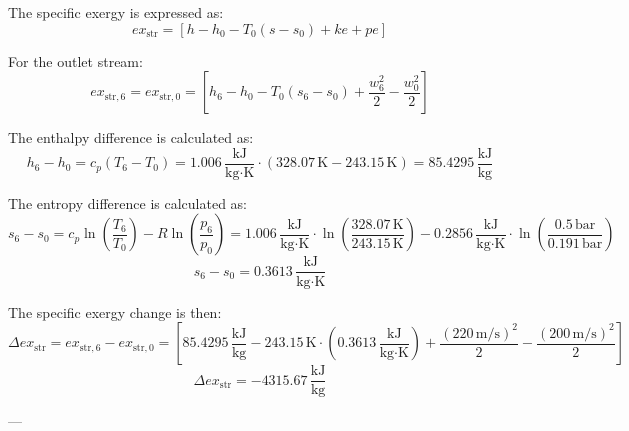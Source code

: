 The specific exergy is expressed as:  
\[
ex_{\text{str}} = \left[ h - h_0 - T_0 (s - s_0) + ke + pe \right]
\]  

For the outlet stream:  
\[
ex_{\text{str},6} = ex_{\text{str},0} = \left[ h_6 - h_0 - T_0 (s_6 - s_0) + \frac{w_6^2}{2} - \frac{w_0^2}{2} \right]
\]  

The enthalpy difference is calculated as:  
\[
h_6 - h_0 = c_p (T_6 - T_0) = 1.006 \, \frac{\text{kJ}}{\text{kg·K}} \cdot (328.07 \, \text{K} - 243.15 \, \text{K}) = 85.4295 \, \frac{\text{kJ}}{\text{kg}}
\]  

The entropy difference is calculated as:  
\[
s_6 - s_0 = c_p \ln \left( \frac{T_6}{T_0} \right) - R \ln \left( \frac{p_6}{p_0} \right) = 1.006 \, \frac{\text{kJ}}{\text{kg·K}} \cdot \ln \left( \frac{328.07 \, \text{K}}{243.15 \, \text{K}} \right) - 0.2856 \, \frac{\text{kJ}}{\text{kg·K}} \cdot \ln \left( \frac{0.5 \, \text{bar}}{0.191 \, \text{bar}} \right)
\]  
\[
s_6 - s_0 = 0.3613 \, \frac{\text{kJ}}{\text{kg·K}}
\]  

The specific exergy change is then:  
\[
\Delta ex_{\text{str}} = ex_{\text{str},6} - ex_{\text{str},0} = \left[ 85.4295 \, \frac{\text{kJ}}{\text{kg}} - 243.15 \, \text{K} \cdot (0.3613 \, \frac{\text{kJ}}{\text{kg·K}}) + \frac{(220 \, \text{m/s})^2}{2} - \frac{(200 \, \text{m/s})^2}{2} \right]
\]  
\[
\Delta ex_{\text{str}} = -4315.67 \, \frac{\text{kJ}}{\text{kg}}
\]  

---